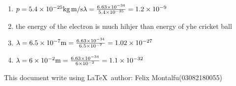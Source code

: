 \documentclass[a4paper]{article}
\begin{document}
\begin{enumerate}[1.]
        \item $p = \num{5.4d-25} \si[per-mode=symbol]{\kilogram\metre\per\second} \\ \lambda = \frac{\num{6.63d-34}}{\num{5.4d-25}} \\ =\num{1.2d-9}$
        \item the energy of the electron is much hihjer than energy of yhe cricket ball
        \item $\lambda = \num{6.5d-7}\si[per-mode=symbol]{\metre} \\ =\frac{\num{6.63d-34}}{\num{6.5d-7}} \\ = \num{1.02d-27}$
        \item $\lambda = \num{6d-2}\si[per-mode=symbol]{\metre} \\ =\frac{\num{6.63d-34}}{\num{6d-2}} \\ =\num{1.1d-32}$
    \end{enumerate}
    This document write using \LaTeX \ author: Felix Montalfu(03082180055) 
\end{document}
